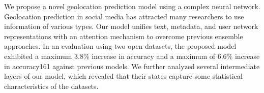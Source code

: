 We propose a novel geolocation prediction model using a complex neural network. Geolocation prediction in social media has attracted many researchers to use information of various types. Our model unifies text, metadata, and user network representations with an attention mechanism to overcome previous ensemble approaches. In an evaluation using two open datasets, the proposed model exhibited a maximum 3.8\% increase in accuracy and a maximum of 6.6\% increase in accuracy\@161 against previous models. We further analyzed several intermediate layers of our model, which revealed that their states capture some statistical characteristics of the datasets.

